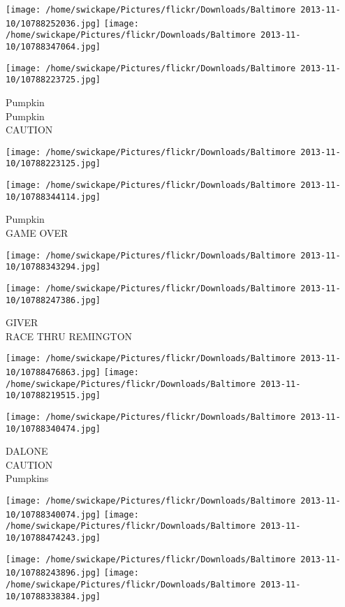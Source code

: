 \documentclass[10pt,letterpaper]{article}
\begin{document}
\texttt{[image: /home/swickape/Pictures/flickr/Downloads/Baltimore 2013-11-10/10788252036.jpg]}
\texttt{[image: /home/swickape/Pictures/flickr/Downloads/Baltimore 2013-11-10/10788347064.jpg]}

\vspace{0.25in}
\texttt{[image: /home/swickape/Pictures/flickr/Downloads/Baltimore 2013-11-10/10788223725.jpg]}

Pumpkin\\
Pumpkin\\
CAUTION
\pagebreak

\texttt{[image: /home/swickape/Pictures/flickr/Downloads/Baltimore 2013-11-10/10788223125.jpg]}

\vspace{0.25in}
\texttt{[image: /home/swickape/Pictures/flickr/Downloads/Baltimore 2013-11-10/10788344114.jpg]}

Pumpkin\\
GAME OVER
\pagebreak

\texttt{[image: /home/swickape/Pictures/flickr/Downloads/Baltimore 2013-11-10/10788343294.jpg]}

\vspace{0.25in}
\texttt{[image: /home/swickape/Pictures/flickr/Downloads/Baltimore 2013-11-10/10788247386.jpg]}

GIVER\\
RACE THRU REMINGTON
\pagebreak

\texttt{[image: /home/swickape/Pictures/flickr/Downloads/Baltimore 2013-11-10/10788476863.jpg]}
\texttt{[image: /home/swickape/Pictures/flickr/Downloads/Baltimore 2013-11-10/10788219515.jpg]}

\vspace{0.25in}
\texttt{[image: /home/swickape/Pictures/flickr/Downloads/Baltimore 2013-11-10/10788340474.jpg]}

DALONE\\
CAUTION\\
Pumpkins
\pagebreak

\texttt{[image: /home/swickape/Pictures/flickr/Downloads/Baltimore 2013-11-10/10788340074.jpg]}
\texttt{[image: /home/swickape/Pictures/flickr/Downloads/Baltimore 2013-11-10/10788474243.jpg]}

\texttt{[image: /home/swickape/Pictures/flickr/Downloads/Baltimore 2013-11-10/10788243896.jpg]}
\texttt{[image: /home/swickape/Pictures/flickr/Downloads/Baltimore 2013-11-10/10788338384.jpg]}
\end{document}
